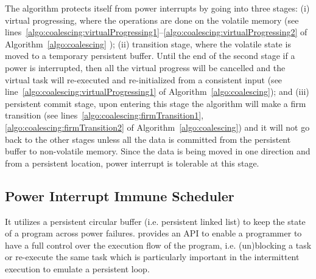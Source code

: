 The algorithm protects itself from power interrupts by going into three stages: (i) virtual progressing, where the operations are done on the volatile memory (see lines~\ref{algo:coalescing:virtualProgressing1}--\ref{algo:coalescing:virtualProgressing2} of Algorithm~\ref{algo:coalescing} ); (ii) transition stage, where the volatile state is moved to a temporary persistent buffer. Until the end of the second stage if a power is interrupted, then all the virtual progress will be cancelled and the virtual task will re-executed and re-initialized from a consistent input (see line~\ref{algo:coalescing:virtualProgressing1} of Algorithm~\ref{algo:coalescing}); and (iii) persistent commit stage, upon entering this stage the algorithm will make a firm transition (see lines~\ref{algo:coalescing:firmTransition1}, \ref{algo:coalescing:firmTransition2} of Algorithm~\ref{algo:coalescing}) and it will not go back to the other stages unless all the data is committed from the persistent buffer to non-volatile memory. Since the data is being moved in one direction and from a persistent location, power interrupt is tolerable at this stage. 

\subsection{Power Interrupt Immune Scheduler}


It utilizes a persistent circular buffer (i.e. persistent linked list) to keep the state of a program across power failures. \sys provides an API to enable a programmer to have a full control over the execution flow of the program, i.e. (un)blocking a task or re-execute the same task which is particularly important in the intermittent execution to emulate a persistent loop. 

%		
%		
